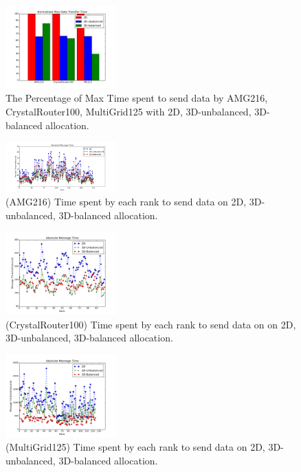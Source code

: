 \documentclass[conference]{IEEEtran}
\begin{document}
\begin{figure}[h!] 
  \centering
  \includegraphics[width=0.38\textwidth]{figs/shapestudy/maxtime}
   \caption{The Percentage of Max Time spent to send data by AMG216, CrystalRouter100, MultiGrid125 with 2D, 3D-unbalanced, 3D-balanced allocation.}
   \label{fig: shapestudy-maxtime}
\end{figure}

\begin{figure}[h!] 
  \centering
  \includegraphics[width=0.38\textwidth]{figs/shapestudy/amg216_rank_msgtime}
   \caption{(AMG216) Time spent by each rank to send data on 2D, 3D-unbalanced, 3D-balanced allocation. }
   \label{fig: shapestudy-amg216}
\end{figure}

\begin{figure}[h!] 
  \centering
  \includegraphics[width=0.38\textwidth]{figs/shapestudy/cr100_rank_msgtime}
   \caption{(CrystalRouter100) Time spent by each rank to send data on on 2D, 3D-unbalanced, 3D-balanced allocation.}
   \label{fig: shapestudy-cr100}
\end{figure}

\begin{figure}[h!] 
  \centering
  \includegraphics[width=0.38\textwidth]{figs/shapestudy/mg125_rank_msgtime}
   \caption{(MultiGrid125) Time spent by each rank to send data on 2D, 3D-unbalanced, 3D-balanced allocation.}
   \label{fig: shapestudy-mg125}
\end{figure}
\end{document}

